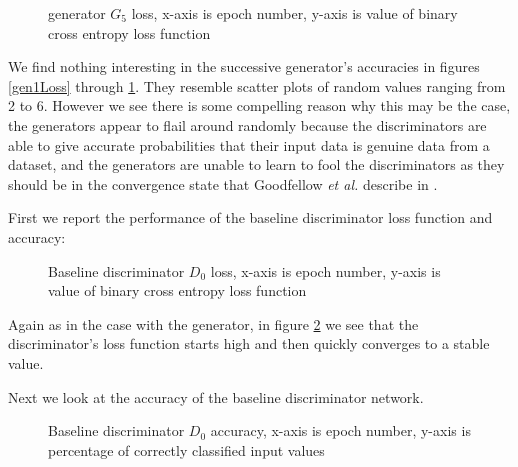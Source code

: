 \documentclass[conference]{IEEEtran}
\begin{document}
\begin{figure}[htpb]
\caption{generator $G_{5}$ loss, x-axis is epoch number, y-axis is 
value of binary cross entropy loss function }
\label{gen5Loss}
\end{figure}

We find nothing interesting in the successive generator's accuracies in
figures \ref{gen1Loss} through \ref{gen5Loss}.  They
resemble scatter plots of random values ranging from 2 to 6.  However we see
there is some compelling reason why this may be the case, the generators appear
to flail around randomly because the discriminators are able to give accurate
probabilities that their input data is genuine data from a dataset, and the
generators are unable to learn to fool the discriminators as they should be in
the convergence state that Goodfellow \textit{et al.} describe in \cite{gan}.

First we report the performance of the baseline discriminator loss function and
accuracy:

\begin{figure}[htpb]
\caption{Baseline discriminator $D_{0}$ loss, x-axis is epoch number, y-axis is 
value of binary cross entropy loss function }
\label{disc0Loss}
\end{figure}

Again as in the case with the generator, in figure \ref{disc0Loss} we see that the 
discriminator's loss function starts high and then quickly converges to a stable 
value.  

Next we look at the accuracy of the baseline discriminator network.

\begin{figure}[htpb]
\caption{Baseline discriminator $D_{0}$ accuracy, x-axis is epoch number, y-axis is 
percentage of correctly classified input values }
\label{disc0Acc}
\end{figure}
\end{document}
